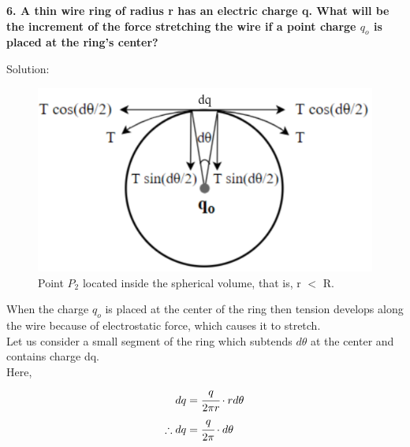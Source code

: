 \newpage
\begin{tcolorbox}
\textbf{6. A thin wire ring of radius r has an electric charge q. What will be the increment of the force stretching the wire if a point charge $q_o$ is placed at the ring's center?}
\end{tcolorbox}
Solution:
\begin{figure}
     \centering 
     \includegraphics[scale = 0.46]{figures/Sandesh's Figures/tnsnrng.png}
     \caption{Point $P_2$ located inside the spherical volume, that is, r $<$ R. }
     \label{tnsrng}
 \end{figure}
When the charge $q_o$ is placed at the center of the ring then tension develops along the wire because of electrostatic force, which causes it to stretch.\\
Let us consider a small segment of the ring which subtends $d\theta$ at the center and contains charge dq.\\
Here,
\begin{align}
    dq &= \cfrac{q}{2 \pi r}\cdot r d\theta \nonumber\\
    \therefore dq &= \cfrac{q}{2 \pi} \cdot d\theta
\end{align} 

